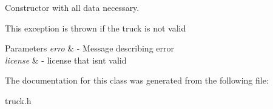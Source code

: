 Constructor with all data necessary. 

This exception is thrown if the truck is not valid


\begin{DoxyParams}{Parameters}
{\em erro} & -\/ Message describing error \\
\hline
{\em license} & -\/ license that isn\textquotesingle{}t valid \\
\hline
\end{DoxyParams}


The documentation for this class was generated from the following file\+:\begin{DoxyCompactItemize}
\item 
truck.\+h\end{DoxyCompactItemize}
